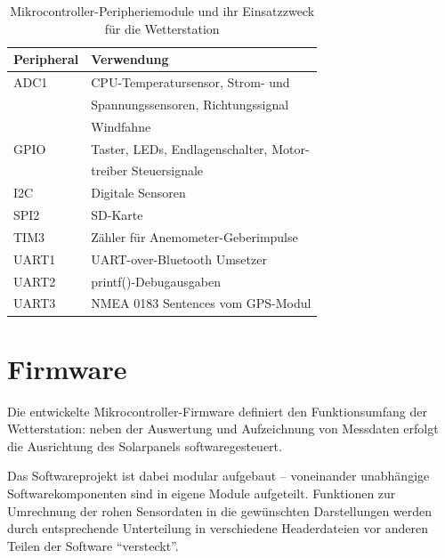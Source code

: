     \begin{table}[H]
        \centering
        \begin{tabular}{|l|l|}
            \hline
            \textbf{Peripheral} & \textbf{Verwendung}                   \\
            \hline
            ADC1                & CPU-Temperatursensor,  Strom- und     \\
                                & Spannungssensoren, Richtungssignal    \\
                                & Windfahne                             \\
            GPIO                & Taster, LEDs, Endlagenschalter, Motor-\\
                                & treiber Steuersignale                 \\
            I2C                 & Digitale Sensoren                     \\
            SPI2                & SD-Karte                              \\
            TIM3                & Zähler für Anemometer-Geberimpulse    \\
            UART1               & UART-over-Bluetooth Umsetzer          \\
            UART2               & printf()-Debugausgaben                \\
            UART3               & NMEA 0183 Sentences vom GPS-Modul     \\
            \hline
        \end{tabular}
        \caption{Mikrocontroller-Peripheriemodule und ihr Einsatzzweck für die Wetterstation}
    \end{table}    

\section{Firmware}\label{cha:C-Code}
    Die entwickelte Mikrocontroller-Firmware definiert den Funktionsumfang der Wetterstation: neben der Auswertung und Aufzeichnung von Messdaten erfolgt die Ausrichtung des Solarpanels softwaregesteuert.
    
    Das Softwareprojekt ist dabei modular aufgebaut -- voneinander unabhängige Softwarekomponenten sind in eigene Module aufgeteilt. Funktionen zur Umrechnung der rohen Sensordaten in die gewünschten Darstellungen werden durch entsprechende Unterteilung in verschiedene Headerdateien vor anderen Teilen der Software ``versteckt''.
    

